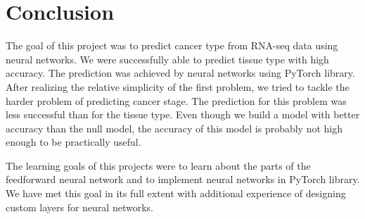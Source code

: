 \chapter*{Conclusion}  %

The goal of this project was to predict cancer type from RNA-seq data using neural networks.
We were successfully able to predict tissue type with high accuracy.
The prediction was achieved by neural networks using PyTorch library.
After realizing the relative simplicity of the first problem, we tried to tackle the harder problem of predicting cancer stage. 
The prediction for this problem was less successful than for the tissue type. 
Even though we build a model with better accuracy than the null model, the accuracy of this model is probably not high enough to be practically useful.

The learning goals of this projects were to learn about the parts of the feedforward neural network and to implement neural networks in PyTorch library.
We have met this goal in its full extent with additional experience of designing custom layers for neural networks.

